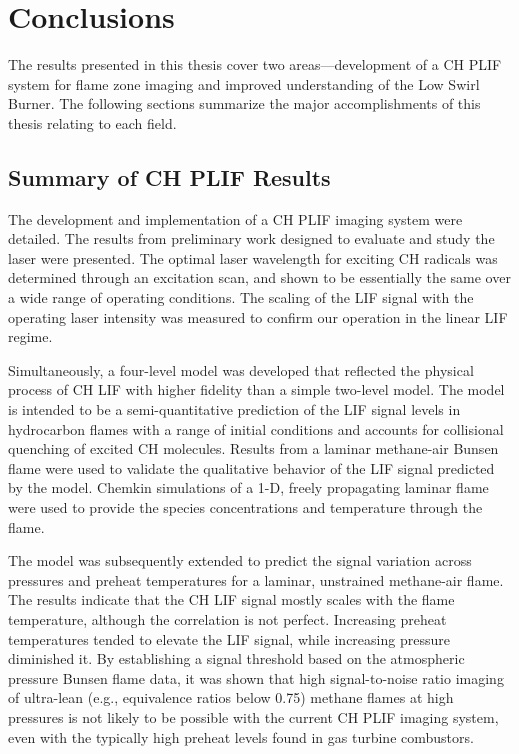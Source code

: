 \chapter{Conclusions}
\label{ch:conclusions}

The results presented in this thesis cover two areas---development of a CH PLIF system for flame zone imaging and improved understanding of the Low Swirl Burner.
The following sections summarize the major accomplishments of this thesis relating to each field.

\section{Summary of CH PLIF Results}

The development and implementation of a CH PLIF imaging system were detailed.
The results from preliminary work designed to evaluate and study the laser were presented.
The optimal laser wavelength for exciting CH radicals was determined through an excitation scan, and shown to be essentially the same over a wide range of operating conditions.
The scaling of the LIF signal with the operating laser intensity was measured to confirm our operation in the linear LIF regime.

Simultaneously, a four-level model was developed that reflected the physical process of CH LIF with higher fidelity than a simple two-level model.
The model is intended to be a semi-quantitative prediction of the LIF signal levels in hydrocarbon flames with a range of initial conditions and accounts for collisional quenching of excited CH molecules.
Results from a laminar methane-air Bunsen flame were used to validate the qualitative behavior of the LIF signal predicted by the model.
Chemkin simulations of a 1-D, freely propagating laminar flame were used to provide the species concentrations and temperature through the flame.

The model was subsequently extended to predict the signal variation across pressures and preheat temperatures for a laminar, unstrained methane-air flame.
The results indicate that the CH LIF signal mostly scales with the flame temperature, although the correlation is not perfect.
Increasing preheat temperatures tended to elevate the LIF signal, while increasing pressure diminished it.
By establishing a signal threshold based on the atmospheric pressure Bunsen flame data, it was shown that high signal-to-noise ratio imaging of ultra-lean (e.g., equivalence ratios below 0.75) methane flames at high pressures is not likely to be possible with the current CH PLIF imaging system, even with the typically high preheat levels found in gas turbine combustors.

